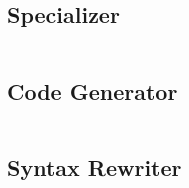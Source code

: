 \documentclass[a4paper, 12pt]{article}
\begin{document}
\subsection{Specializer}
\inputminted{ocaml}{/Users/kristofferkortbaek/src/PAT_project/mocaml/lib/pe.ml}

\subsection{Code Generator}
\inputminted{ocaml}{/Users/kristofferkortbaek/src/PAT_project/mocaml/lib/codegen.ml}

\subsection{Syntax Rewriter}
\inputminted{ocaml}{/Users/kristofferkortbaek/src/PAT_project/mocaml/lib/extenders.ml}
\end{document}
